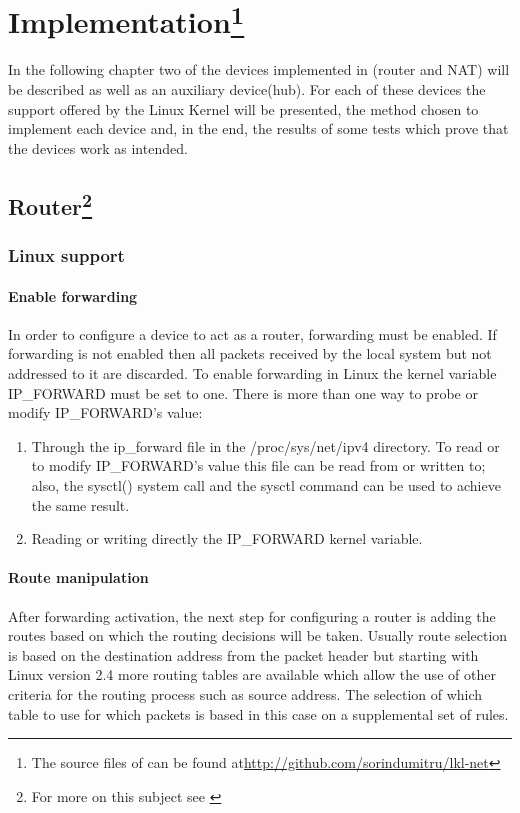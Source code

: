 \chapter[Implementation]{Implementation\footnote{The source files of \project can be found at\url{http://github.com/sorindumitru/lkl-net}}}
\label{chapter:impl}
In the following chapter two of the devices implemented in \project(router and NAT) will be described 
as well as an auxiliary device(hub). For each of these devices the support offered by the 
Linux Kernel will be presented, the method chosen to implement each device and, in the end, the results 
of some tests which prove that the devices work as intended.

\section[Router]{Router\footnote{For more on this subject see \cite{linnetarch}}}
\label{sec:router-impl}

\subsection{Linux support}
\label{sub-sec:router-linux}

\subsubsection{Enable forwarding}
In order to configure a device to act as a router, forwarding must be enabled. If forwarding is not enabled 
then all packets received by the local system but not addressed to it are discarded.  To enable forwarding in Linux the 
kernel variable IP_FORWARD must be set to one. There is more than one way to probe or modify IP_FORWARD's value:
\renewcommand{\theenumi}{\alph{enumi}}
\begin{enumerate}
\item Through the ip_forward file in the /proc/sys/net/ipv4 directory. To read or to modify IP_FORWARD's value this file can be read from or written to; also, the sysctl() system call and the sysctl command can be used to achieve the same result. 
\item Reading or writing directly the IP_FORWARD kernel variable. 
\end{enumerate}
\renewcommand{\theenumi}{\arabic{enumi}}

\subsubsection{Route manipulation}
After forwarding activation, the next step for configuring a router is adding the routes based on which 
the routing decisions will be taken. Usually route selection is based on the destination address from the 
packet header but starting with Linux version 2.4 more routing tables are available which allow the use of 
other criteria for the routing process such as source address. The selection of which table to use for which 
packets is based in this case on a supplemental set of rules.

